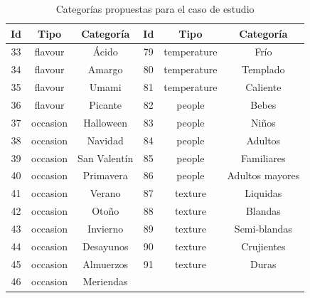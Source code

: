       \begin{table}
        \begin{center}
          \begin{tabular}{ | c | c | c | c | c | c |}
            \toprule
            Id & Tipo & Categoría & Id & Tipo & Categoría\\
            \midrule
            33 & flavour  & Ácido & 79 & temperature  & Frío \\
            \midrule
            34 & flavour  & Amargo & 80 & temperature  & Templado \\
            \midrule
            35 & flavour  & Umami & 81 & temperature  & Caliente \\
            \midrule
            36 & flavour  & Picante & 82 & people  & Bebes \\
            \midrule
            37 & occasion  & Halloween & 83 & people  & Niños \\
            \midrule
            38 & occasion  & Navidad & 84 & people  & Adultos \\
            \midrule
            39 & occasion  & San Valentín & 85 & people  & Familiares \\
            \midrule
            40 & occasion  & Primavera & 86 & people  & Adultos mayores \\
            \midrule
            41 & occasion  & Verano & 87 & texture  & Liquidas \\
            \midrule
            42 & occasion  & Otoño & 88 & texture  & Blandas \\
            \midrule
            43 & occasion  & Invierno & 89 & texture  & Semi-blandas \\
            \midrule
            44 & occasion  & Desayunos & 90 & texture  & Crujientes \\
            \midrule
            45 & occasion  & Almuerzos & 91 & texture  & Duras \\
            \midrule
            46 & occasion  & Meriendas & & & \\
            \bottomrule
          \end{tabular}
          \caption{Categorías propuestas para el caso de estudio}
          \label{Categorías propuestas para el caso de estudio}
        \end{center}
      \end{table}



